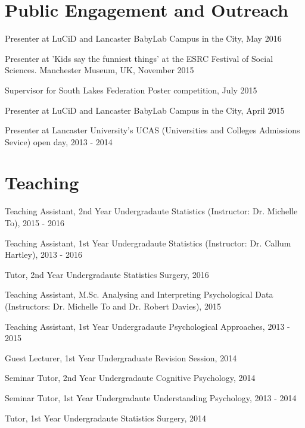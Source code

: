 \documentclass[letterpaper]{article}
\renewenvironment{itemize}{
  \begin{list}{}{
    \setlength{\leftmargin}{1.5em}
  }
}{
  \end{list}
}
\begin{document}
\section*{Public Engagement and Outreach}
\begin{itemize}
\item Presenter at LuCiD and Lancaster BabyLab Campus in the City, May 2016
\item Presenter at 'Kids say the funniest things' at the ESRC Festival of Social Sciences. Manchester Museum, UK, November 2015
\item Supervisor for South Lakes Federation Poster competition, July 2015
\item Presenter at LuCiD and Lancaster BabyLab Campus in the City, April 2015
\item Presenter at Lancaster University's UCAS (Universities and Colleges Admissions Sevice) open day, 2013 - 2014
\end{itemize}

\section*{Teaching}
\begin{itemize}
\item Teaching Assistant, 2nd Year Undergradaute Statistics (Instructor: Dr. Michelle To), 2015 - 2016
\item Teaching Assistant, 1st Year Undergradaute Statistics (Instructor: Dr. Callum Hartley), 2013 - 2016
\item Tutor, 2nd Year Undergradaute Statistics Surgery, 2016
\item Teaching Assistant, M.Sc. Analysing and Interpreting Psychological Data (Instructors: Dr. Michelle To and Dr. Robert Davies), 2015
\item Teaching Assistant, 1st Year Undergradaute Psychological Approaches, 2013 - 2015
\item Guest Lecturer, 1st Year Undergraduate Revision Session, 2014
\item Seminar Tutor, 2nd Year Undergradaute Cognitive Psychology, 2014
\item Seminar Tutor, 1st Year Undergradaute Understanding Psychology, 2013 - 2014
\item Tutor, 1st Year Undergradaute Statistics Surgery, 2014


\end{itemize}

\end{document}

